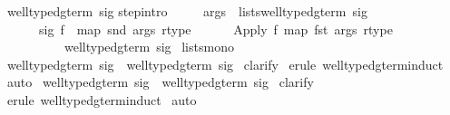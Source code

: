 \begin{isabellebody}
\isamarkupfalse%
\ {\isachardoublequote}well{\isacharunderscore}typed{\isacharunderscore}gterm{\isacharprime}\ sig{\isachardoublequote}\isanewline
{}\isanewline
step{\isacharbrackleft}intro{\isacharbang}{\isacharbrackright}{\isacharcolon}\ \isanewline
\ \ \ \ {\isachardoublequote}{\isasymlbrakk}args\ {\isasymin}\ lists{\isacharparenleft}well{\isacharunderscore}typed{\isacharunderscore}gterm{\isacharprime}\ sig{\isacharparenright}{\isacharsemicolon}\ \isanewline
\ \ \ \ \ \ sig\ f\ {\isacharequal}\ {\isacharparenleft}map\ snd\ args{\isacharcomma}\ rtype{\isacharparenright}{\isasymrbrakk}\isanewline
\ \ \ \ \ {\isasymLongrightarrow}\ {\isacharparenleft}Apply\ f\ {\isacharparenleft}map\ fst\ args{\isacharparenright}{\isacharcomma}\ rtype{\isacharparenright}\ \isanewline
\ \ \ \ \ \ \ \ \ {\isasymin}\ well{\isacharunderscore}typed{\isacharunderscore}gterm{\isacharprime}\ sig{\isachardoublequote}\isanewline
{}\ lists{\isacharunderscore}mono\isanewline
\isanewline
\isanewline
\isamarkupfalse%
\ {\isachardoublequote}well{\isacharunderscore}typed{\isacharunderscore}gterm\ sig\ {\isasymsubseteq}\ well{\isacharunderscore}typed{\isacharunderscore}gterm{\isacharprime}\ sig{\isachardoublequote}\isanewline
%
\isadelimproof
%
\endisadelimproof
%
\isatagproof
\isamarkupfalse%
\ clarify\isanewline
\isamarkupfalse%
\ {\isacharparenleft}erule\ well{\isacharunderscore}typed{\isacharunderscore}gterm{\isachardot}induct{\isacharparenright}\isanewline
\isamarkupfalse%
\ auto\isanewline
\isamarkupfalse%
%
\endisatagproof
{\isafoldproof}%
%
\isadelimproof
\isanewline
%
\endisadelimproof
\isanewline
\isamarkupfalse%
\ {\isachardoublequote}well{\isacharunderscore}typed{\isacharunderscore}gterm{\isacharprime}\ sig\ {\isasymsubseteq}\ well{\isacharunderscore}typed{\isacharunderscore}gterm\ sig{\isachardoublequote}\isanewline
%
\isadelimproof
%
\endisadelimproof
%
\isatagproof
\isamarkupfalse%
\ clarify\isanewline
\isamarkupfalse%
\ {\isacharparenleft}erule\ well{\isacharunderscore}typed{\isacharunderscore}gterm{\isacharprime}{\isachardot}induct{\isacharparenright}\isanewline
\isamarkupfalse%
\ auto\isanewline
\isamarkupfalse%
%
\endisatagproof
{\isafoldproof}%
%
\isadelimproof
\isanewline
%
\endisadelimproof
\isanewline
%
\isadelimtheory
\isanewline
%
\endisadelimtheory
%
\isatagtheory
\isamarkupfalse%
%
\endisatagtheory
{\isafoldtheory}%
%
\isadelimtheory
\isanewline
%
\endisadelimtheory
\isanewline
\end{isabellebody}%
